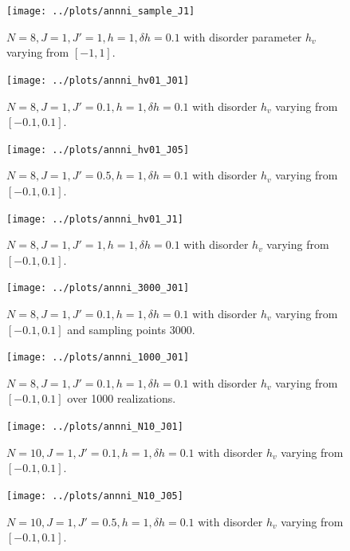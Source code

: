 \documentclass[a4paper]{article}
\begin{document}
\begin{figure}[h!]
  \centering
  \texttt{[image: ../plots/annni\_sample\_J1]}
  \caption{$N = 8, J = 1,  J'= 1, h = 1, \delta h = 0.1$ with disorder parameter $h_v$ varying from $[-1,1]$.}
  \label{fig:}
\end{figure}

\begin{figure}[h!]
  \centering
  \texttt{[image: ../plots/annni\_hv01\_J01]}
  \caption{$N = 8, J = 1, J'=0.1, h = 1, \delta h = 0.1$ with disorder $h_v$ varying from $[-0.1,0.1]$.}
  \label{fig:}
\end{figure}

\begin{figure}[h!]
  \centering
  \texttt{[image: ../plots/annni\_hv01\_J05]}
  \caption{$N = 8, J = 1, J'=0.5, h = 1, \delta h = 0.1$ with disorder $h_v$ varying from $[-0.1,0.1]$.}
  \label{fig:}
\end{figure}

\begin{figure}[h!]
  \centering
  \texttt{[image: ../plots/annni\_hv01\_J1]}
  \caption{$N = 8, J = 1, J'=1, h = 1, \delta h = 0.1$ with disorder $h_v$ varying from $[-0.1,0.1]$.}
  \label{fig:}
\end{figure}

\begin{figure}[h!]
  \centering
  \texttt{[image: ../plots/annni\_3000\_J01]}
  \caption{$N = 8, J = 1, J'=0.1, h = 1, \delta h = 0.1$ with disorder $h_v$ varying from $[-0.1,0.1]$ and sampling points 3000.}
  \label{fig:}
\end{figure}

\begin{figure}[h!]
  \centering
  \texttt{[image: ../plots/annni\_1000\_J01]}
  \caption{$N = 8, J = 1, J'=0.1, h = 1, \delta h = 0.1$ with disorder $h_v$ varying from $[-0.1,0.1]$  over 1000 realizations.}
  \label{fig:}
\end{figure}

\begin{figure}[h!]
  \centering
  \texttt{[image: ../plots/annni\_N10\_J01]}
  \caption{$N = 10, J = 1, J'=0.1, h = 1, \delta h = 0.1$ with disorder $h_v$ varying from $[-0.1,0.1]$.}
  \label{fig:}
\end{figure}

\begin{figure}[h!]
  \centering
  \texttt{[image: ../plots/annni\_N10\_J05]}
  \caption{$N = 10, J = 1, J'=0.5, h = 1, \delta h = 0.1$ with disorder $h_v$ varying from $[-0.1,0.1]$.}
  \label{fig:}
\end{figure}
\end{document}
